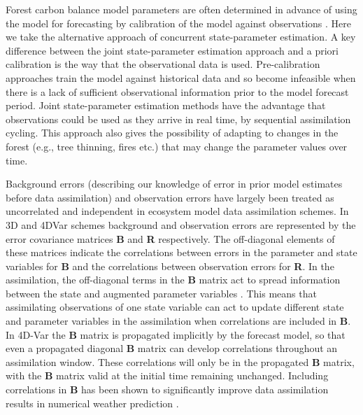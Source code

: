 \documentclass[review]{elsarticle}
\begin{document}
Forest carbon balance model parameters are often determined in advance of using the model for forecasting by calibration of the model against observations \citep{richardson2010estimating, Bloom2015}. Here we take the alternative approach of concurrent state-parameter estimation. A key difference between the joint state-parameter estimation approach and a priori calibration is the way that the observational data is used. Pre-calibration approaches train the model against historical data and so become infeasible when there is a lack of sufficient observational information prior to the model forecast period. Joint state-parameter estimation methods have the advantage that observations could be used as they arrive in real time, by sequential assimilation cycling. This approach also gives the possibility of adapting to changes in the forest (e.g., tree thinning, fires etc.) that may change the parameter values over time. 

Background errors (describing our knowledge of error in prior model estimates before data assimilation) and observation errors have largely been treated as uncorrelated and independent in ecosystem model data assimilation schemes. In 3D and 4DVar schemes background and observation errors are represented by the error covariance matrices \textbf{B} and \textbf{R} respectively. The off-diagonal elements of these matrices indicate the correlations between errors in the parameter and state variables for \textbf{B} and the correlations between observation errors for \textbf{R}. In the assimilation, the off-diagonal terms in the \textbf{B} matrix act to spread information between the state and augmented parameter variables \citep{kalnay2003atmospheric}. This means that assimilating observations of one state variable can act to update different state and parameter variables in the assimilation when correlations are included in \textbf{B}. In 4D-Var the \textbf{B} matrix is propagated implicitly by the forecast model, so that even a propagated diagonal \textbf{B} matrix can develop correlations throughout an assimilation window. These correlations will only be in the propagated \textbf{B} matrix, with the \textbf{B} matrix valid at the initial time remaining unchanged. Including correlations in \textbf{B} has been shown to significantly improve data assimilation results in numerical weather prediction \citep{bannister2008review}. 
\end{document}
